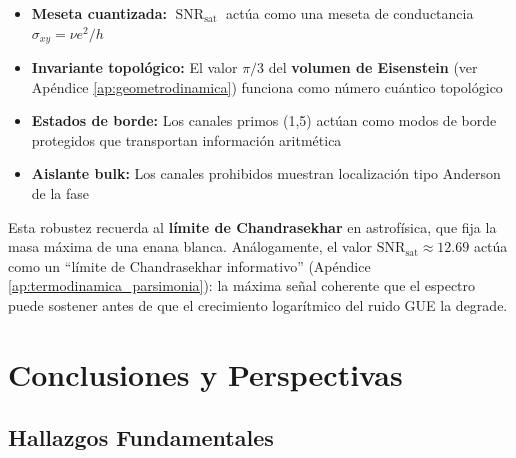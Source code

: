 \documentclass[12pt, a4paper]{article}
\theoremstyle{plain}
\theoremstyle{definition}
\theoremstyle{remark}
\newcommand{\SNR}{\operatorname{SNR}}
\begin{document}
\begin{itemize}
    \item \textbf{Meseta cuantizada:} $\SNR_{\text{sat}}$ actúa como una 
          meseta de conductancia $\sigma_{xy} = \nu e^2/h$
    \item \textbf{Invariante topológico:} El valor $\pi/3$ del \textbf{volumen de Eisenstein} (ver Apéndice \ref{ap:geometrodinamica}) funciona como número cuántico topológico
    \item \textbf{Estados de borde:} Los canales primos (1,5) actúan como 
          modos de borde protegidos que transportan información aritmética
    \item \textbf{Aislante bulk:} Los canales prohibidos muestran localización 
          tipo Anderson de la fase
\end{itemize}

Esta robustez recuerda al \textbf{límite de Chandrasekhar} en astrofísica, que fija la masa máxima de una enana blanca. Análogamente, el valor $\mathrm{SNR}_{\mathrm{sat}} \approx 12.69$ actúa como un ``límite de Chandrasekhar informativo'' (Apéndice \ref{ap:termodinamica_parsimonia}): la máxima señal coherente que el espectro puede sostener antes de que el crecimiento logarítmico del ruido GUE la degrade.

\section{Conclusiones y Perspectivas}
\label{sec:conclusiones}

\subsection{Hallazgos Fundamentales}
\label{subsec:hallazgos}
\end{document}
